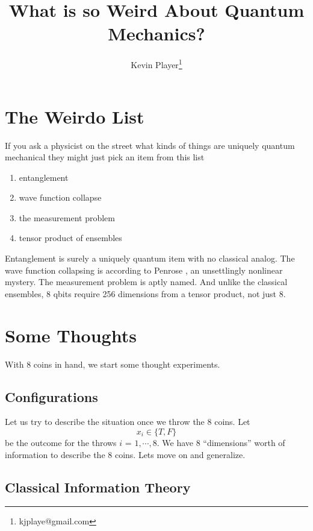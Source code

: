 \documentclass[12pt,a4paper]{article}
\begin{document}
\title{What is so Weird About Quantum Mechanics?}
\author[1]{Kevin Player\footnote{kjplaye@gmail.com}}

\maketitle


\section{The Weirdo List}
If you ask a physicist on the street what kinds of things are uniquely quantum mechanical they might just pick an item from this list

\begin{enumerate}
\item entanglement
\item wave function collapse
\item the measurement problem
\item tensor product of ensembles
\end{enumerate}

Entanglement is surely a uniquely quantum item with no classical analog.  The wave function collapsing is according to Penrose \cite{penrose}, an unsettlingly nonlinear mystery.  The measurement problem is aptly named.  And unlike the classical ensembles, 8 qbits require 256 dimensions from a tensor product, not just 8.

\section{Some Thoughts}
With 8 coins in hand, we start some thought experiments.
\subsection{Configurations}
Let us try to describe the situation once we throw the 8 coins.  Let
\[
x_i \in \{T,F\}
\]
be the outcome for the throws $i$ = $1,\cdots,8$.  We have 8 ``dimensions'' worth of information to describe the 8 coins.  Lets move on and generalize.
  
\subsection{Classical Information Theory}
\end{document}
